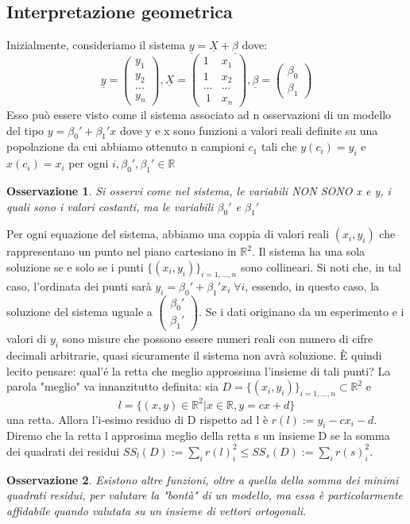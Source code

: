 \documentclass[12pt]{article}
\newenvironment{para}{\begin{adjustwidth}{13mm}{}}{\end{adjustwidth}}
\newtheorem{Osservazione}{Osservazione}[subsection]
\begin{document}
\begin{para}
\subsection{Interpretazione geometrica}
Inizialmente, consideriamo il sistema $\underline{y} = \underline{X} + \underline{\beta}$ dove: $$\underline{y} = \begin{pmatrix}
    y_1 \\
    y_2 \\
    ... \\
    y_n
\end{pmatrix}, \underline{X} = \begin{pmatrix}
    1 & x_1 \\
    1 & x_2 \\
    ... & ... \\\
    1 & x_n
\end{pmatrix}, \underline{\beta} = \begin{pmatrix}
    \beta_0 \\
    \beta_1
\end{pmatrix}$$
Esso può essere visto come il sistema associato ad n osservazioni di un modello del tipo $y = \beta_0' + \beta_1'x$ dove y e x sono funzioni a valori reali definite su una popolazione da cui abbiamo ottenuto n campioni $c_1$ tali che $y(c_i) = y_i$ e $x(c_i)=x_i$ per ogni $i, \beta_0', \beta_1' \in \mathbb{R}$
\begin{Osservazione}
    Si osservi come nel sistema, le variabili NON SONO x e y, i quali sono i valori costanti, ma le variabili $\beta_0'$ e $\beta_1'$
\end{Osservazione}
Per ogni equazione del sistema, abbiamo una coppia di valori reali $(x_i, y_i)$ che rappresentano un punto nel piano cartesiano in $\mathbb{R}^2$. Il sistema ha una sola soluzione se e solo se i punti $\{(x_i, y_i)\}_{i = 1,...,n}$ sono collineari. Si noti che, in tal caso, l'ordinata dei punti sarà $y_i =\beta_0'+\beta_1'x_i \; \forall i$, essendo, in questo caso, la soluzione del sistema uguale a $\begin{pmatrix}
    \beta_0' \\
    \beta_1'
\end{pmatrix}.$\newline
Se i dati originano da un esperimento e i valori di $y_i$ sono misure che possono essere numeri reali con numero di cifre decimali arbitrarie, quasi sicuramente il sistema non avrà soluzione. È quindi lecito pensare: qual'é la retta che meglio approssima l'insieme di tali punti? \newline
La parola "meglio" va innanzitutto definita: sia $D = \{(x_i, y_i)\}_{i=1,...,n} \subset \mathbb{R}^2$ e $$l = \{(x,y)\in \mathbb{R}^2 | x\in \mathbb{R}, y = cx + d\}$$ una retta. Allora l'i-esimo residuo di D rispetto ad l è $r(l) := y_i - cx_i -d$. Diremo che la retta l approsima meglio della retta s un insieme D se la somma dei quadrati dei residui $SS_l(D) := \sum_{i} r(l)_i^2 \leq SS_s(D) := \sum_i r(s)_i^2$.
\begin{Osservazione}
    Esistono altre funzioni, oltre a quella della somma dei minimi quadrati residui, per valutare la "bontà" di un modello, ma essa è particolarmente affidabile quando valutata su un insieme di vettori ortogonali.  
\end{Osservazione}

\end{para}
\end{document}
